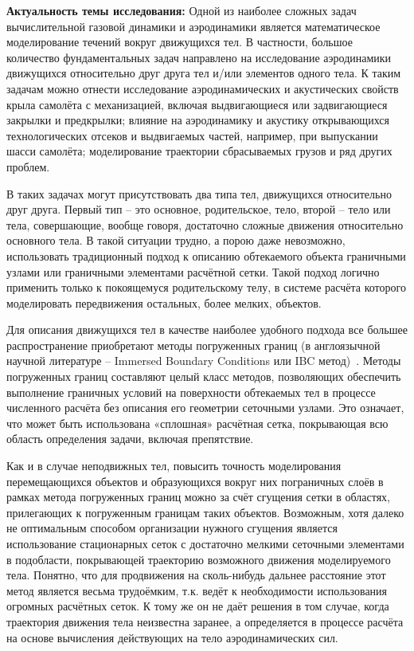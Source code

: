 
{\actuality} \par{\textbf{Актуальность темы исследования:}} 
Одной из наиболее сложных задач вычислительной газовой динамики и аэродинамики является математическое моделирование течений вокруг движущихся тел.
В частности,  большое количество фундаментальных задач направлено на исследование  аэродинамики движущихся относительно друг друга тел и/или элементов одного тела.
К таким задачам можно отнести исследование аэродинамических и акустических свойств крыла самолёта с механизацией, включая выдвигающиеся или задвигающиеся закрылки и предкрылки; влияние на аэродинамику и акустику открывающихся технологических отсеков и выдвигаемых частей, например, при выпускании шасси самолёта; моделирование траектории сбрасываемых грузов и ряд других проблем. 

В таких задачах могут присутствовать два типа тел, движущихся относительно друг друга. Первый тип – это основное, родительское, тело, второй – тело или тела, совершающие, вообще говоря, достаточно сложные движения относительно основного тела. В такой ситуации трудно, а порою даже невозможно, использовать традиционный подход к описанию обтекаемого объекта граничными узлами или граничными элементами расчётной сетки. Такой подход логично применить только к покоящемуся родительскому телу, в системе расчёта которого моделировать передвижения остальных, более мелких, объектов. 

Для описания движущихся тел в качестве наиболее удобного подхода все большее распространение приобретают методы погруженных границ (в англоязычной научной литературе – Immersed Boundary Conditions или IBC метод)~\cite{mittal2005immersed, boiron2009high, brown2014characteristic}.
Методы погруженных границ составляют целый класс методов, позволяющих обеспечить выполнение граничных условий на поверхности обтекаемых тел в процессе численного расчёта без описания его геометрии сеточными узлами. Это означает, что может быть использована «сплошная» расчётная сетка, покрывающая всю область определения задачи, включая препятствие. 

Как и в случае неподвижных тел, повысить точность моделирования перемещающихся объектов и образующихся вокруг них пограничных слоёв в рамках метода погруженных границ можно за счёт сгущения сетки в областях, прилегающих к погруженным границам таких объектов. Возможным, хотя далеко не оптимальным способом  организации нужного сгущения является использование стационарных сеток с достаточно мелкими сеточными элементами в подобласти, покрывающей траекторию возможного движения моделируемого тела. Понятно, что для продвижения на сколь-нибудь дальнее расстояние этот метод является весьма трудоёмким, т.к. ведёт к необходимости использования огромных расчётных сеток. К тому же он не даёт решения в том случае, когда траектория движения тела неизвестна заранее, а определяется в процессе расчёта на основе вычисления действующих на тело аэродинамических сил. 


